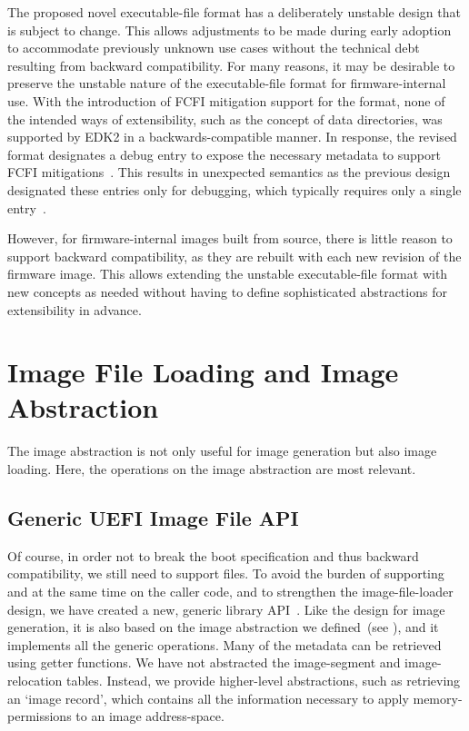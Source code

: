 The proposed novel  \gls{executable-file} format has a deliberately unstable design that is subject to change. This allows adjustments to be made during early adoption to accommodate previously unknown use cases without the technical debt resulting from backward compatibility. For many reasons, it may be desirable to preserve the unstable nature of the \gls{executable-file} format for \gls{firmware}-internal use. With the introduction of \gls{FCFI} mitigation support for the  format, none of the intended ways of extensibility, such as the concept of data directories, was supported by \gls{EDK2} in a backwards-compatible manner. In response, the revised  format designates a  debug entry to expose the necessary metadata to support \gls{FCFI} mitigations~\cite{pe-format}. This results in unexpected semantics as the previous design designated these entries only for debugging, which typically requires only a single entry~\cite{edk2}.

However, for \gls{firmware}-internal images built from source, there is little reason to support backward compatibility, as they are rebuilt with each new revision of the \gls{firmware} image. This allows extending the unstable \gls{executable-file} format with new concepts as needed without having to define sophisticated abstractions for extensibility in advance.

\section{Image File Loading and Image Abstraction}
\label{sec:loading_abstr}

The \gls{image} abstraction is not only useful for \gls{image} generation but also \gls{image} loading. Here, the operations on the \gls{image} abstraction are most relevant.

\subsection{Generic UEFI Image File API}

Of course, in order not to break the  boot specification and thus backward compatibility, we still need to support  files. To avoid the burden of supporting  and  at the same time on the caller code, and to strengthen the \gls{image-file-loader} design, we have created a new, generic \gls{library} \gls{API}~\cite{thesis-git}. Like the design for \gls{image} generation, it is also based on the  \gls{image} abstraction we defined~(see ), and it implements all the generic operations. Many of the metadata can be retrieved using getter functions. We have not abstracted the \gls{image-segment} and \gls{image-relocation} tables. Instead, we provide higher-level abstractions, such as retrieving an `\gls{image} record', which contains all the information necessary to apply \gls{memory-permissions} to an \gls{image} \gls{address-space}.

